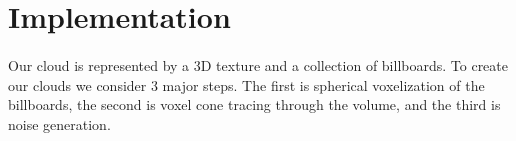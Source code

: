 

\newpage
\section{Implementation}\paragraph{}
Our cloud is represented by a 3D texture and a collection of billboards. To create our clouds we consider 3 major steps. The first is spherical voxelization of the billboards, the second is voxel cone tracing through the volume, and the third is noise generation.




